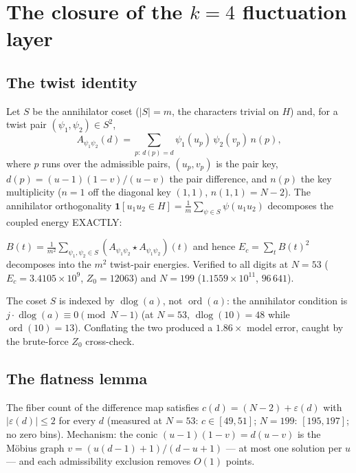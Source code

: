 
\section{The closure of the \texorpdfstring{$k=4$}{k=4} fluctuation layer}
\label{sec:r95}

\subsection{The twist identity}

Let $S$ be the annihilator coset ($|S| = m$, the characters trivial on
$H$) and, for a twist pair $(\psi_1,\psi_2) \in S^2$,
\[
  A_{\psi_1\psi_2}(d) = \sum_{p:\, d(p) = d} \psi_1(u_p)\,\psi_2(v_p)\,n(p),
\]
where $p$ runs over the admissible pairs, $(u_p,v_p)$ is the pair key,
$d(p) = (u{-}1)(1{-}v)/(u{-}v)$ the pair difference, and $n(p)$ the key
multiplicity ($n = 1$ off the diagonal key $(1,1)$, $n(1,1) = N{-}2$).
The annihilator orthogonality
$\mathbf{1}[u_1u_2 \in H] = \tfrac{1}{m}\sum_{\psi \in S}\psi(u_1u_2)$
decomposes the coupled energy EXACTLY:

\begin{theorem}
\label{thm:twist}
$B(t) = \tfrac{1}{m^2}\sum_{\psi_1,\psi_2 \in S}
(A_{\psi_1\psi_2} \star A_{\psi_1\psi_2})(t)$ and hence
$E_c = \sum_t B(t)^2$ decomposes into the $m^2$ twist-pair energies.
Verified to all digits at $N = 53$ ($E_c = 3.4105 \times 10^9$, $Z_0 =
12063$) and $N = 199$ ($1.1559 \times 10^{11}$, $96\,641$).
\end{theorem}

\begin{remark}
The coset $S$ is indexed by $\operatorname{dlog}(a)$, not
$\operatorname{ord}(a)$: the annihilator condition is
$j \cdot \operatorname{dlog}(a) \equiv 0 \pmod{N-1}$ (at $N = 53$,
$\operatorname{dlog}(10) = 48$ while $\operatorname{ord}(10) = 13$).
Conflating the two produced a $1.86\times$ model error, caught by the
brute-force $Z_0$ cross-check.
\end{remark}

\subsection{The flatness lemma}

\begin{theorem}[flatness]
\label{thm:flatness}
The fiber count of the difference map satisfies
$c(d) = (N{-}2) + \varepsilon(d)$ with $|\varepsilon(d)| \le 2$ for
every $d$ (measured at $N = 53$: $c \in [49,51]$; $N = 199$:
$[195,197]$; no zero bins).  Mechanism: the conic
$(u{-}1)(1{-}v) = d(u{-}v)$ is the M\"obius graph
$v = (u(d{-}1)+1)/(d{-}u+1)$ — at most one solution per $u$ — and each
admissibility exclusion removes $O(1)$ points.
\end{theorem}

